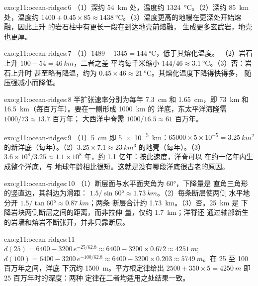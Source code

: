 \begin{solution}{exo:g11:ocean-ridges:6}
（1）深约 \qty{54}{km} 处，温度约 \qty{1324}{\celsius}。（2）深约
\qty{85}{km} 处，温度约 $1400 + 0.45 \times 85 \approx
\qty{1438}{\celsius}$。（3）温度更高的地幔在更深处开始熔融，因此上升
的岩石柱中有更长一段在到达地壳前熔融，
生成更多玄武岩，地壳也更厚。
\end{solution}

\begin{solution}{exo:g11:ocean-ridges:7}
（1）$1489 - 1345 = \qty{144}{\celsius}$，低于其熔化温度。
（2）岩石上升 $100 - 54 = \qty{46}{km}$，二者之差
平均每千米缩小 $144/46 \approx \qty{3.1}{\celsius}$。（3）否：岩石上升时
甚至略有降温，约为 $0.45 \times 46 \approx
\qty{21}{\celsius}$。其熔化温度下降得快得多，
随压强减小而降低。
\end{solution}

\begin{solution}{exo:g11:ocean-ridges:8}
半扩张速率分别为每年 \qty{7.3}{cm} 和 \qty{1.65}{cm}，即
\qty{73}{km} 和 \qty{16.5}{km}（每百万年）。要在一侧形成 \qty{1000}{km} 的
洋底，东太平洋海隆需 $1000/73 \approx 13.7$ 百万年；
大西洋中脊需 $1000/16.5 \approx 61$ 百万年。
\end{solution}

\begin{solution}{exo:g11:ocean-ridges:9}
（1）\qty{5}{cm} 即 \qty{5e-5}{km}：$65000 \times 5 \times 10^{-5} =
\qty{3.25}{km^2}$ 的新洋底（每年）。（2）$3.25 \times 7.1 \approx
\qty{23}{km^3}$ 的地壳（每年）。（3）$3.6 \times 10^8 / 3.25 \approx 1.1
\times 10^8$ 年，约 1.1 亿年：按此速度，洋脊可以
在约一亿年内生成整个洋底，与
地球年龄相比很短。这就是没有哪段洋底很古老的原因。
\end{solution}

\begin{solution}{exo:g11:ocean-ridges:10}
（1）断层面与水平面夹角为 \ang{60}，下降量是
直角三角形的竖直边，其斜边为滑距：
$1.5/\sin\ang{60} \approx \qty{1.73}{km}$。（2）每条断层使两侧
水平地分开 $1.5/\tan\ang{60} \approx \qty{0.87}{km}$；两条
断层合计约 \qty{1.73}{km}。（3）否。\qty{25}{km} 是
下降岩块两侧断层之间的距离，而非拉伸
量，仅约 \qty{1.7}{km}；洋脊还
通过轴部新生的岩墙和熔岩不断张开，并非只靠断层。
\end{solution}

\begin{solution}{exo:g11:ocean-ridges:11}
$d(25) = 6400 - 3200\,e^{-25/62.8} \approx 6400 - 3200 \times 0.672 \approx
\qty{4251}{m}$; $d(100) = 6400 - 3200\,e^{-100/62.8} \approx 6400 - 3200
\times 0.203 \approx \qty{5749}{m}$。在 25 至 100 百万年之间，洋底
下沉约 \qty{1500}{m}。平方根定律给出
$2500 + 350 \times 5 = \qty{4250}{m}$ 即 25 百万年时的深度：两种
定律在二者均适用之处结果一致。
\end{solution}


